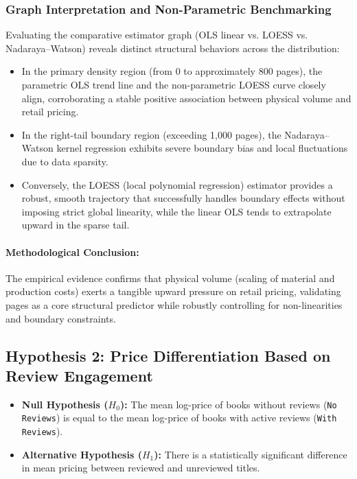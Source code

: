 \documentclass[11pt,a4paper]{article}
\begin{document}
\subsubsection*{Graph Interpretation and Non-Parametric Benchmarking}
Evaluating the comparative estimator graph (OLS linear vs. LOESS vs. Nadaraya--Watson) reveals distinct structural behaviors across the distribution:
\begin{itemize}
    \item In the primary density region (from 0 to approximately 800 pages), the parametric OLS trend line and the non-parametric LOESS curve closely align, corroborating a stable positive association between physical volume and retail pricing.

    \item In the right-tail boundary region (exceeding 1,000 pages), the Nadaraya--Watson kernel regression exhibits severe boundary bias and local fluctuations due to data sparsity.

    \item Conversely, the LOESS (local polynomial regression) estimator provides a robust, smooth trajectory that successfully handles boundary effects without imposing strict global linearity, while the linear OLS tends to extrapolate upward in the sparse tail.
\end{itemize}

\paragraph{Methodological Conclusion:} The empirical evidence confirms that physical volume (scaling of material and production costs) exerts a tangible upward pressure on retail pricing, validating pages as a core structural predictor while robustly controlling for non-linearities and boundary constraints.


\subsection{Hypothesis 2: Price Differentiation Based on Review Engagement}

\begin{itemize}
    \item \textbf{Null Hypothesis ($H_0$):} The mean log-price of books without reviews (\texttt{No Reviews}) is equal to the mean log-price of books with active reviews (\texttt{With Reviews}).

    \item \textbf{Alternative Hypothesis ($H_1$):} There is a statistically significant difference in mean pricing between reviewed and unreviewed titles.
\end{itemize}
\end{document}
